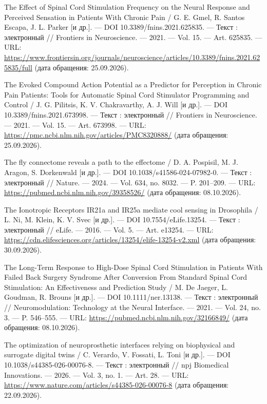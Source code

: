 \begin{list}{}{\setlength{\leftmargin}{10mm}\setlength{\labelwidth}{8mm}\setlength{\labelsep}{2mm}\setlength{\itemsep}{0pt}\setlength{\parsep}{0pt}\setlength{\topsep}{0pt}}
\item[273.] The Effect of Spinal Cord Stimulation Frequency on the Neural Response and Perceived Sensation in Patients With Chronic Pain / G. E. Gmel, R. Santos Escapa, J. L. Parker [и др.]. — DOI 10.3389/fnins.2021.625835. — Текст : электронный // Frontiers in Neuroscience. — 2021. — Vol. 15. — Art. 625835. — URL: \url{https://www.frontiersin.org/journals/neuroscience/articles/10.3389/fnins.2021.625835/full} (дата обращения: 25.09.2026).
\item[274.] The Evoked Compound Action Potential as a Predictor for Perception in Chronic Pain Patients: Tools for Automatic Spinal Cord Stimulator Programming and Control / J. G. Pilitsis, K. V. Chakravarthy, A. J. Will [и др.]. — DOI 10.3389/fnins.2021.673998. — Текст : электронный // Frontiers in Neuroscience. — 2021. — Vol. 15. — Art. 673998. — URL: \url{https://pmc.ncbi.nlm.nih.gov/articles/PMC8320888/} (дата обращения: 25.09.2026).
\item[275.] The fly connectome reveals a path to the effectome / D. A. Pospisil, M. J. Aragon, S. Dorkenwald [и др.]. — DOI 10.1038/s41586-024-07982-0. — Текст : электронный // Nature. — 2024. — Vol. 634, no. 8032. — P. 201–209. — URL: \url{https://pubmed.ncbi.nlm.nih.gov/39358526/} (дата обращения: 08.10.2026).
\item[276.] The Ionotropic Receptors IR21a and IR25a mediate cool sensing in Drosophila / L. Ni, M. Klein, K. V. Svec [и др.]. — DOI 10.7554/eLife.13254. — Текст : электронный // eLife. — 2016. — Vol. 5. — Art. e13254. — URL: \url{https://cdn.elifesciences.org/articles/13254/elife-13254-v2.xml} (дата обращения: 30.09.2026).
\item[277.] The Long-Term Response to High-Dose Spinal Cord Stimulation in Patients With Failed Back Surgery Syndrome After Conversion From Standard Spinal Cord Stimulation: An Effectiveness and Prediction Study / M. De Jaeger, L. Goudman, R. Brouns [и др.]. — DOI 10.1111/ner.13138. — Текст : электронный // Neuromodulation: Technology at the Neural Interface. — 2021. — Vol. 24, no. 3. — P. 546–555. — URL: \url{https://pubmed.ncbi.nlm.nih.gov/32166849/} (дата обращения: 08.10.2026).
\item[278.] The optimization of neuroprosthetic interfaces relying on biophysical and surrogate digital twins / C. Verardo, V. Fossati, L. Toni [и др.]. — DOI 10.1038/s44385-026-00076-8. — Текст : электронный // npj Biomedical Innovations. — 2026. — Vol. 3, no. 1. — Art. 28. — URL: \url{https://www.nature.com/articles/s44385-026-00076-8} (дата обращения: 22.09.2026).

\end{list}
